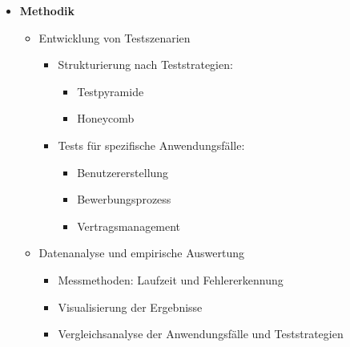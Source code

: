 \begin{itemize}
	\item \textbf{Methodik}
	\begin{itemize}
		\item Entwicklung von Testszenarien
		\begin{itemize}
			\item Strukturierung nach Teststrategien:
			\begin{itemize}
				\item Testpyramide
				\item Honeycomb
			\end{itemize}
			\item Tests für spezifische Anwendungsfälle:
			\begin{itemize}
				\item Benutzererstellung
				\item Bewerbungsprozess
				\item Vertragsmanagement
			\end{itemize}
		\end{itemize}
		\item Datenanalyse und empirische Auswertung
		\begin{itemize}
			\item Messmethoden: Laufzeit und Fehlererkennung
			\item Visualisierung der Ergebnisse
			\item Vergleichsanalyse der Anwendungsfälle und Teststrategien
		\end{itemize}
	\end{itemize}
	

\end{itemize}
